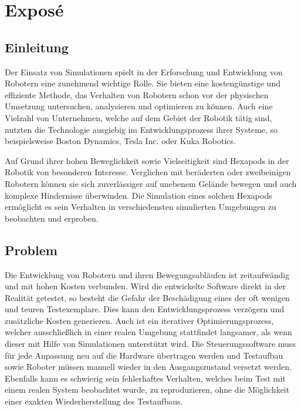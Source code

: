 \chapter{Exposé}
\label{ch:expose}



\section{Einleitung}
Der Einsatz von Simulationen spielt in der Erforschung und Entwicklung von Robotern eine zunehmend wichtige Rolle\cite{afzal2020study}. 
Sie bieten eine kostengünstige und effiziente Methode, das Verhalten von Robotern schon vor der physischen Umsetzung untersuchen, analysieren und optimieren zu können\cite{de2019analysis}. 
Auch eine Vielzahl von Unternehmen, welche auf dem Gebiet der Robotik tätig sind, nutzten die Technologie ausgiebig im Entwicklungsprozess ihrer Systeme, so beispielsweise Boston Dynamics\cite{BostonDynamicsSimulation}, Tesla Inc.\cite{TeslaAiDay2022} oder Kuka Robotics\cite{KukaSim}.

Auf Grund ihrer hohen Beweglichkeit sowie Vielseitigkeit sind Hexapods in der Robotik von besonderen Interesse. 
Verglichen mit beräderten oder zweibeinigen Robotern können sie sich zuverlässiger auf unebenem Gelände bewegen und auch komplexe Hindernisse überwinden\cite{barai2013smart, atifystructure}.
Die Simulation eines solchen Hexapods ermöglicht es sein Verhalten in verschiedensten simulierten Umgebungen zu beobachten und erproben.

\section{Problem}

Die Entwicklung von Robotern und ihren Bewegungsabläufen ist zeitaufwändig und mit hohen Kosten verbunden\cite{ahmadian2005model}.
Wird die entwickelte Software direkt in der Realität getestet, so besteht die Gefahr der Beschädigung eines der oft wenigen und teuren Testexemplare.
Dies kann den Entwicklungsprozess verzögern und zusätzliche Kosten generieren.
Auch ist ein iterativer Optimierungsprozess, welcher ausschließlich in einer realen Umgebung stattfindet langsamer, als wenn dieser mit Hilfe von Simulationen unterstützt wird.
Die Steuerungssoftware muss für jede Anpassung neu auf die Hardware übertragen werden und Testaufbau sowie Roboter müssen manuell wieder in den Ausgangszustand versetzt werden.
Ebenfalls kann es schwierig sein fehlerhaftes Verhalten, welches beim Test mit einem realen System beobachtet wurde, zu reproduzieren, ohne die Möglichkeit einer exakten Wiederherstellung des Testaufbaus.

